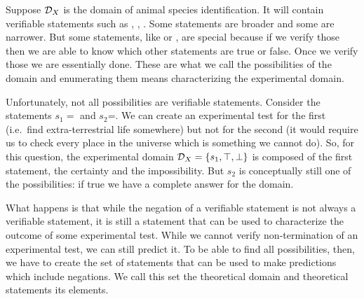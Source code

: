 \documentclass[11pt,letterpaper,fleqn]{memoir} %
\begin{document}
Suppose $\mathcal{D}_X$ is the domain of animal species identification. It will contain verifiable statements such as , , . Some statements are broader and some are narrower. But some statements, like  or , are special because if we verify those then we are able to know which other statements are true or false. Once we verify those we are essentially done. These are what we call the possibilities of the domain and enumerating them means characterizing the experimental domain.

Unfortunately, not all possibilities are verifiable statements. Consider the statements $s_1=$ and $s_2$=. We can create an experimental test for the first (i.e.~find extra-terrestrial life somewhere) but not for the second (it would require us to check every place in the universe which is something we cannot do). So, for this question, the experimental domain $\mathcal{D}_X = \{s_1, \top, \bot\}$ is composed of the first statement, the certainty and the impossibility. But $s_2$ is conceptually still one of the possibilities: if true we have a complete answer for the domain.

What happens is that while the negation of a verifiable statement is not always a verifiable statement, it is still a statement that can be used to characterize the outcome of some experimental test. While we cannot verify non-termination of an experimental test, we can still predict it. To be able to find all possibilities, then, we have to create the set of statements that can be used to make predictions which include negations. We call this set the theoretical domain and theoretical statements its elements.
\end{document}
